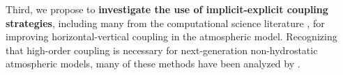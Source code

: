 \documentclass[11pt]{article}
\begin{document}
Third, we propose to \textbf{investigate the use of implicit-explicit coupling strategies}, including many from the computational science literature \cite{UASJRRJS1997AMM, CACMHK2003ANM}, for improving horizontal-vertical coupling in the atmospheric model.  Recognizing that high-order coupling is necessary for next-generation non-hydrostatic atmospheric models, many of these methods have been analyzed by \cite{HWSJLNW2013JCP}.





\end{document}
